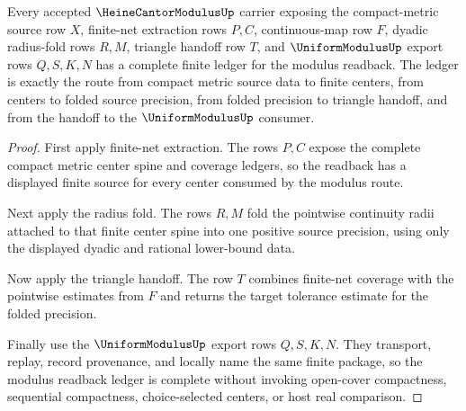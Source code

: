 \begin{theorem}
\label{thm:heine-cantor-modulus-net-ledger-totality}
Every accepted $\HeineCantorModulusUp$ carrier exposing the compact-metric
source row $X$, finite-net extraction rows $P,C$, continuous-map row $F$,
dyadic radius-fold rows $R,M$, triangle handoff row $T$, and
$\UniformModulusUp$ export rows $Q,S,K,N$ has a complete finite ledger for the
modulus readback. The ledger is exactly the route from compact metric source
data to finite centers, from centers to folded source precision, from folded
precision to triangle handoff, and from the handoff to the
$\UniformModulusUp$ consumer.
\end{theorem}
\begin{proof}
First apply finite-net extraction. The rows $P,C$ expose the complete compact
metric center spine and coverage ledgers, so the readback has a displayed
finite source for every center consumed by the modulus route.

Next apply the radius fold. The rows $R,M$ fold the pointwise continuity
radii attached to that finite center spine into one positive source precision,
using only the displayed dyadic and rational lower-bound data.

Now apply the triangle handoff. The row $T$ combines finite-net coverage with
the pointwise estimates from $F$ and returns the target tolerance estimate for
the folded precision.

Finally use the $\UniformModulusUp$ export rows $Q,S,K,N$. They transport,
replay, record provenance, and locally name the same finite package, so the
modulus readback ledger is complete without invoking open-cover compactness,
sequential compactness, choice-selected centers, or host real comparison.
\end{proof}

